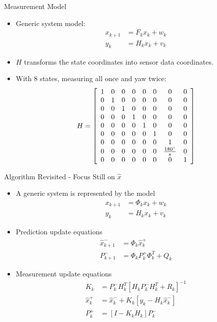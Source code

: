 \documentclass[hyperref={pdfpagelabels=false}]{beamer}
\begin{document}
\begin{frame}{Measurement Model}
\begin{itemize}
\item Generic system model:
\begin{align*}
x_{k+1} &= F_kx_k + w_k \\
y_k &= H_kx_k + v_k
\end{align*}
\item $H$ transforms the state coordinates into sensor data coordinates.
\item With 8 states, measuring all once and yaw twice:
\begin{align*}
H = \left[\begin{array}{c c c c c c c c}
1 & 0 & 0 & 0 & 0 & 0 & 0 & 0 \\
0 & 1 & 0 & 0 & 0 & 0 & 0 & 0 \\
0 & 0 & 1 & 0 & 0 & 0 & 0 & 0 \\
0 & 0 & 0 & 1 & 0 & 0 & 0 & 0 \\
0 & 0 & 0 & 0 & 1 & 0 & 0 & 0 \\
0 & 0 & 0 & 0 & 0 & 1 & 0 & 0 \\
0 & 0 & 0 & 0 & 0 & 0 & 1 & 0 \\
0 & 0 & 0 & 0 & 0 & 0 & \frac{180^\circ}{\pi} & 0 \\
0 & 0 & 0 & 0 & 0 & 0 & 0 & 1
\end{array}\right]
\end{align*}
\end{itemize}
\end{frame}

\begin{frame}{Algorithm Revisited - Focus Still on $\hat{x}$}
\begin{itemize}
\item A generic system is represented by the model
\begin{align*}
x_{k+1} &= \Phi_kx_k + w_k \\
y_k &= H_kx_k + v_k
\end{align*}
\item Prediction update equations
\begin{align*}
\hat{x}_{k+1}^- &= \Phi_k\hat{x}_k^+ \\
P_{k+1}^- &= \Phi_kP_k^+\Phi_k^T + Q_k
\end{align*}
\item Measurement update equations
\begin{align*}
K_k &= P_k^-H_k^T\left[H_kP_k^-H_k^T + R_k\right]^{-1} \\
\hat{x}_k^+ &= \hat{x}_k^- + K_k\left[y_k - H_k\hat{x}_k^-\right] \\
P_k^+ &= \left[I - K_kH_k\right]P_k^-
\end{align*}
\end{itemize}
\end{frame}
\end{document}
